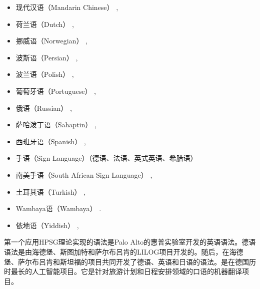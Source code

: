 \begin{itemize}
\item 现代汉语（Mandarin Chinese） 
\citep*{Liu97a,%
Ng97a,%
ML2009a,ML2013a,FSB2015a-u},
\item 荷兰语（Dutch） \citep*{NB94,BvNM2001a-u,Fokkens2011a},
\item 挪威语（Norwegian） \citep{HH2004a-u,BH2004a-u,HB2006a-u,Haugereid2017a-u}, 
\item 波斯语（Persian） \citep{MuellerPersian,MG2010a},
\item 波兰语（Polish） \citep*{PKMM2002a-u,MMPK2003a-u}, %
\item 葡萄牙语（Portuguese） \citep{BC2008a-u,BC2008b-single-quotes,CB2010a-u},
\item 俄语（Russian） \citep{AZ2009a-u}, %
\item 萨哈泼丁语（Sahaptin） \citep{Drellishak2009a-u}, %
\item 西班牙语（Spanish）
  \citep*{PinedaMeza2005-u,PinedaMeza2005b-u,Bildhauer2008a,Marimon2013a-u%
}, 
\item 手语（Sign Language）（德语、法语、英式英语、希腊语）
\item 南美手语（South African Sign Language） \citep{Bungeroth2002a-u},
\item 土耳其语（Turkish） \citep*{FPB09a-u},
\item Wambaya语（Wambaya） \citep{Bender2008b-u,Bender2008a,Bender2010a-u}.
\item 依地语（Yiddish） \citep{MOe2011a},
\end{itemize}
第一个应用HPSG理论实现的语法是Palo Alto的惠普实验室开发的英语语法\citep*{FPW85a,Flickinger87}。德语语法是由海德堡、斯图加特和萨尔布吕肯的LILOG项目开发的。随后，在海德堡、萨尔布吕肯和斯坦福的\verbmobil 项目共同开发了德语、英语和日语的语法。\verbmobil 是在德国历时最长的人工智能项目。它是针对旅游计划和日程安排领域的口语的机器翻译项目\citep{Wahlster2000a-ed-not-crossreferenced}。


